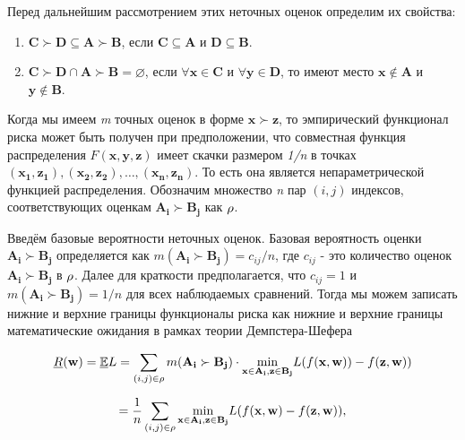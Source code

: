 \documentclass[12pt,a4paper,oneside]{article}
\begin{document}
\par
Перед дальнейшим рассмотрением этих неточных оценок определим их свойства:

\begin{enumerate}
\item \(\mathbf{C} \succ \mathbf{D} \subseteq \mathbf{A} \succ \mathbf{B}\), если \(\mathbf{C} \subseteq \mathbf{A}\) и \(\mathbf{D} \subseteq \mathbf{B}\).

\item \(\mathbf{C} \succ \mathbf{D} \cap \mathbf{A} \succ \boldsymbol{B} = \varnothing\), если \(\forall\mathbf{x} \in \mathbf{C}\) и \(\forall\mathbf{y} \in \mathbf{D}\), то имеют место \(\mathbf{x} \notin \mathbf{A}\) и \(\mathbf{y} \notin \mathbf{B}\).
\end{enumerate}


\par 
Когда мы имеем \emph{m} точных оценок в форме \(\mathbf{x} \succ \mathbf{z}\), то эмпирический функционал риска может быть получен при предположении, что совместная функция распределения \(F(\mathbf{x}, \mathbf{y}, \mathbf{z})\) имеет скачки размером \emph{1/n} в точках \((\mathbf{x_1}, \mathbf{z_1}), (\mathbf{x_2}, \mathbf{z_2}), \dots, (\mathbf{x_n}, \mathbf{z_n})\). 
То есть она является непараметрической функцией распределения. 
Обозначим множество \emph{n} пар \((i, j)\) индексов, соответствующих оценкам \(\mathbf{A_i} \succ \mathbf{B_j}\) как \(\mathrm{\rho}\). 

\par
Введём базовые вероятности неточных оценок. 
Базовая вероятность оценки \(\mathbf{A_i} \succ \mathbf{B_j}\) определяется как \(m(\mathbf{A_i} \succ \mathbf{B_j}) = c_{ij} / n\), где \(c_{ij}\) - это количество оценок \(\mathbf{A_i} \succ \mathbf{B_j}\) в \(\mathrm{\rho}\). 
Далее для краткости предполагается, что \(c_{ij} = 1\) и \(m(\mathbf{A_i} \succ \mathbf{B_j}) = 1/n\) для всех наблюдаемых сравнений. 
Тогда мы можем записать нижние и верхние границы функционалы риска как нижние и верхние границы математические ожидания в рамках теории Демпстера-Шефера

\[
\underline{R}(\mathbf{w}) = \mathbb{\underline{E}}L = \sum \limits_{(i,j) \in \Rho} m(\mathbf{A_i} \succ \mathbf{B_j}) \cdot \underset{%
	\mathbf{x} \in \mathbf{A_i}, \mathbf{z} \in \mathbf{B_j}%
}{\operatorname{min}} %
L(f(\mathbf{x}, \mathbf{w})) - f(\mathbf{z}, \mathbf{w}))
\]

\[
= \frac{1}{n} \sum \limits_{(i,j) \in \Rho} \underset{%
\mathbf{x} \in \mathbf{A_i}, \mathbf{z} \in \mathbf{B_j}%
}{\operatorname{min}}%
L(f(\mathbf{x}, \mathbf{w}) - f(\mathbf{z}, \mathbf{w})),
\]
\end{document}
